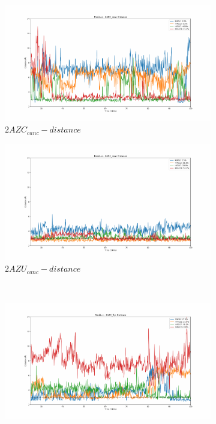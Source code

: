 \begin{figure}[!ht]
\centering
   \begin{subfigure}{.45\textwidth}
     \centering
     \includegraphics[width=.95\linewidth]{chapter4/2AZC_canc/2AZC_canc-dist_3.pdf}
     \caption{$2AZC_{canc}-distance$}
     \label{fig:2AZC_canc-dist}
   \end{subfigure}
   \begin{subfigure}{.45\textwidth}
     \centering
     \includegraphics[width=.95\linewidth]{chapter4/2AZU_canc/2AZU_canc-dist_4.pdf}
     \caption{$2AZU_{canc}-distance$}
     \label{fig:2AZU_canc-dist}
   \end{subfigure}
   \\
   \begin{subfigure}{.45\textwidth}
     \centering
     \includegraphics[width=.95\linewidth]{chapter4/2AZC_flip/2AZC_flip-dist_3.pdf}

\end{subfigure}
\end{figure}
